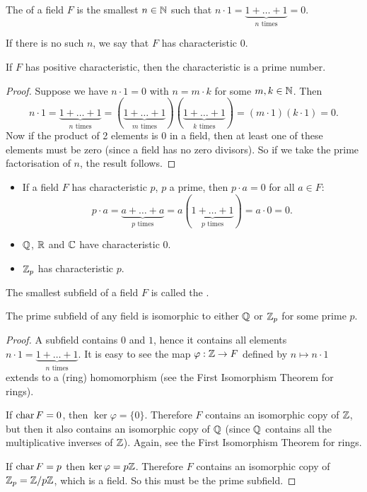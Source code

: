 \begin{definition}
	The  of a field $F$ is the  smallest $n \in \mathbb{N}$ such that $n \cdot 1 = \underbrace{1 + \ldots + 1}_{n \text{ times}} = 0$.
	
	If there is no such $n$, we say that $F$ has characteristic $0$.
\end{definition}

\begin{proposition}
	If $F$ has positive characteristic, then the characteristic is a prime number.
	\begin{proof}
		Suppose we have $n \cdot 1 = 0$ with $n = m \cdot k$ for some $m, k \in \mathbb{N}$. Then
		\[
			n \cdot 1 = \underbrace{1 + \ldots + 1}_{n \text{ times}} = (\underbrace{1 + \ldots + 1}_{m \text{ times}})(\underbrace{1 + \ldots + 1}_{k \text{ times}}) = (m \cdot 1)(k \cdot 1) = 0.
		\]
		Now if the product of 2 elements is $0$ in a field, then at least one of these elements must be zero (since a field has no zero divisors). So if we take the prime factorisation of $n$, the result follows.
	\end{proof}
\end{proposition}

\begin{remarks}\hfill
	\begin{itemize}
		\item If a field $F$ has characteristic $p$, $p$ a prime, then $p \cdot a = 0$ for all $a \in F$:
		\[
			p \cdot a = \underbrace{a + \ldots + a}_{p \text{ times}} = a(\underbrace{1 + \ldots + 1}_{p \text{ times}}) = a \cdot 0 = 0.
		\]
		\item $\mathbb{Q}$, $\mathbb{R}$ and $\mathbb{C}$ have characteristic $0$.
		\item $\mathbb{Z}_p$ has characteristic $p$.
	\end{itemize}
\end{remarks}

\begin{definition}
	The smallest subfield of a field $F$ is called the .
\end{definition}

\begin{proposition}
	The prime subfield of any field is isomorphic to either $\mathbb{Q}$ or $\mathbb{Z}_p$ for some prime $p$.
	\begin{proof}
		A subfield contains $0$ and $1$, hence it contains all elements $n \cdot 1 = \underbrace{1 + \ldots + 1}_{n \text{ times}}$. It is easy to see the map $\varphi : \mathbb{Z} \to F$ defined by $n \mapsto n \cdot 1$ extends to a (ring) homomorphism (see the First Isomorphism Theorem for rings).
		
		If $\operatorname{char}{F} = 0$, then $\ker{\varphi} = \{0\}$. Therefore $F$ contains an isomorphic copy of $\mathbb{Z}$, but then it also contains an isomorphic copy of $\mathbb{Q}$ (since $\mathbb{Q}$ contains all the multiplicative inverses of $\mathbb{Z}$). Again, see the First Isomorphism Theorem for rings.
		
		If $\operatorname{char}{F} = p$ then $\ker{\varphi} = p\mathbb{Z}$. Therefore $F$ contains an isomorphic copy of $\mathbb{Z}_p = \mathbb{Z} / p\mathbb{Z}$, which is  a field. So this must be the prime subfield.
	\end{proof}
\end{proposition}

